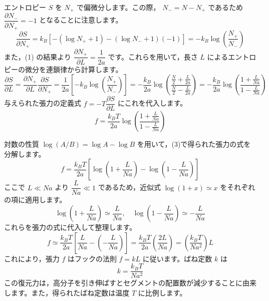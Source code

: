\begin{solutionparts}
エントロピー $S$ を $N_+$ で偏微分します。この際， $N_- = N - N_+$ であるため $\dfrac{\partial N_-}{\partial N_+} = -1$ となることに注意します。
\begin{equation*}
\frac{\partial S}{\partial N_+} = k_B \left[ - (\log N_+ + 1) - (\log N_- + 1)(-1) \right] = -k_B \log \left( \frac{N_+}{N_-} \right)
\end{equation*}
また，(1) の結果より $\dfrac{\partial N_+}{\partial L} = \dfrac{1}{2a}$ です。これらを用いて，長さ $L$ によるエントロピーの微分を連鎖律から計算します。
\begin{equation*}
\frac{\partial S}{\partial L} = \frac{\partial N_+}{\partial L} \frac{\partial S}{\partial N_+} = \frac{1}{2a} \left[ -k_B \log \left( \frac{N_+}{N_-} \right) \right] = -\frac{k_B}{2a} \log \left( \frac{\frac{N}{2} + \frac{L}{2a}}{\frac{N}{2} - \frac{L}{2a}} \right) = -\frac{k_B}{2a} \log \left( \frac{1 + \frac{L}{Na}}{1 - \frac{L}{Na}} \right)
\end{equation*}
与えられた張力の定義式 $f = -T \dfrac{\partial S}{\partial L}$ にこれを代入します。
\begin{equation*}
f = \frac{k_B T}{2a} \log \left( \frac{1 + \frac{L}{Na}}{1 - \frac{L}{Na}} \right)
\end{equation*}

対数の性質 $\log(A/B) = \log A - \log B$ を用いて，(3)で得られた張力の式を分解します。
\begin{equation*}
f = \frac{k_B T}{2a} \left[ \log \left( 1 + \frac{L}{Na} \right) - \log \left( 1 - \frac{L}{Na} \right) \right]
\end{equation*}
ここで $L \ll Na$ より $\dfrac{L}{Na} \ll 1$ であるため，近似式 $\log(1+x) \simeq x$ をそれぞれの項に適用します。
\begin{equation*}
\log \left( 1 + \frac{L}{Na} \right) \simeq \frac{L}{Na}, \quad \log \left( 1 - \frac{L}{Na} \right) \simeq -\frac{L}{Na}
\end{equation*}
これらを張力の式に代入して整理します。
\begin{equation*}
f \simeq \frac{k_B T}{2a} \left[ \frac{L}{Na} - \left( -\frac{L}{Na} \right) \right] = \frac{k_B T}{2a} \left( \frac{2L}{Na} \right) = \left( \frac{k_B T}{N a^2} \right) L
\end{equation*}
これにより，張力 $f$ はフックの法則 $f = k L$ に従います。ばね定数 $k$ は
\begin{equation*}
k = \frac{k_B T}{N a^2}
\end{equation*}
この復元力は，高分子を引き伸ばすとセグメントの配置数が減少することに由来します。また，得られたばね定数は温度 $T$ に比例します。

\end{solutionparts}
